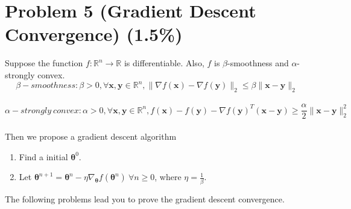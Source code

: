 \documentclass{article}
\begin{document}
\newpage
\section*{Problem 5 (Gradient Descent Convergence) (1.5\%)}
 Suppose the function $f:\mathbb{R}^n \rightarrow \mathbb{R}$ is differentiable. Also, $f$ is $\beta$-smoothness and $\alpha$-strongly convex. \\
 $$\beta-smoothness: \beta > 0, \forall \boldsymbol{x}, \boldsymbol{y} \in \mathbb{R}^n, 
 \lVert \nabla f(\boldsymbol{x})- \nabla f(\boldsymbol{y}) \rVert_2  \leq  \beta \lVert \boldsymbol{x} - \boldsymbol{y} \rVert_2$$ \\
 $$\alpha-strongly \ convex: \alpha > 0, \forall \boldsymbol{x}, \boldsymbol{y} \in \mathbb{R}^n, 
 f(\boldsymbol{x})-f(\boldsymbol{y})-\nabla f(\boldsymbol{y})^T (\boldsymbol{x} - \boldsymbol{y}) \geq \frac{\alpha}{2} \lVert \boldsymbol{x} - \boldsymbol{y} \rVert_2^2$$ \\
 Then we propose a gradient descent algorithm
 \begin{enumerate}
    \item Find a initial $\boldsymbol{\theta}^0.$
     \item Let $\boldsymbol{\theta}^{n+1} = \boldsymbol{\theta}^{n} - \eta \nabla_{\boldsymbol{\theta}}f(\boldsymbol{\theta}^n) \ \forall n \geq 0$, where $\eta=\frac{1}{\beta}.$
 \end{enumerate}
The following problems lead you to prove the gradient descent convergence.
\end{document}
